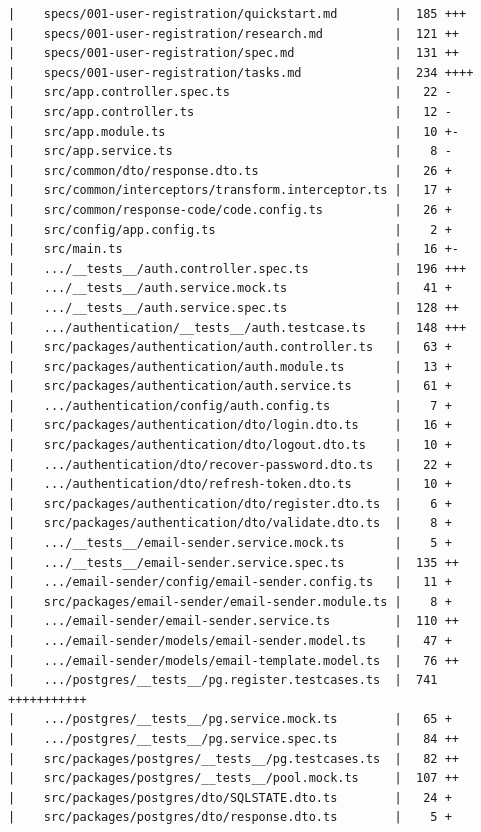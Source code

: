 \documentclass[12pt]{article}
\begin{document}
\begin{lstlisting}[numbers=none,breaklines=true]
|    specs/001-user-registration/quickstart.md        |  185 +++
|    specs/001-user-registration/research.md          |  121 ++
|    specs/001-user-registration/spec.md              |  131 ++
|    specs/001-user-registration/tasks.md             |  234 ++++
|    src/app.controller.spec.ts                       |   22 -
|    src/app.controller.ts                            |   12 -
|    src/app.module.ts                                |   10 +-
|    src/app.service.ts                               |    8 -
|    src/common/dto/response.dto.ts                   |   26 +
|    src/common/interceptors/transform.interceptor.ts |   17 +
|    src/common/response-code/code.config.ts          |   26 +
|    src/config/app.config.ts                         |    2 +
|    src/main.ts                                      |   16 +-
|    .../__tests__/auth.controller.spec.ts            |  196 +++
|    .../__tests__/auth.service.mock.ts               |   41 +
|    .../__tests__/auth.service.spec.ts               |  128 ++
|    .../authentication/__tests__/auth.testcase.ts    |  148 +++
|    src/packages/authentication/auth.controller.ts   |   63 +
|    src/packages/authentication/auth.module.ts       |   13 +
|    src/packages/authentication/auth.service.ts      |   61 +
|    .../authentication/config/auth.config.ts         |    7 +
|    src/packages/authentication/dto/login.dto.ts     |   16 +
|    src/packages/authentication/dto/logout.dto.ts    |   10 +
|    .../authentication/dto/recover-password.dto.ts   |   22 +
|    .../authentication/dto/refresh-token.dto.ts      |   10 +
|    src/packages/authentication/dto/register.dto.ts  |    6 +
|    src/packages/authentication/dto/validate.dto.ts  |    8 +
|    .../__tests__/email-sender.service.mock.ts       |    5 +
|    .../__tests__/email-sender.service.spec.ts       |  135 ++
|    .../email-sender/config/email-sender.config.ts   |   11 +
|    src/packages/email-sender/email-sender.module.ts |    8 +
|    .../email-sender/email-sender.service.ts         |  110 ++
|    .../email-sender/models/email-sender.model.ts    |   47 +
|    .../email-sender/models/email-template.model.ts  |   76 ++
|    .../postgres/__tests__/pg.register.testcases.ts  |  741 +++++++++++
|    .../postgres/__tests__/pg.service.mock.ts        |   65 +
|    .../postgres/__tests__/pg.service.spec.ts        |   84 ++
|    src/packages/postgres/__tests__/pg.testcases.ts  |   82 ++
|    src/packages/postgres/__tests__/pool.mock.ts     |  107 ++
|    src/packages/postgres/dto/SQLSTATE.dto.ts        |   24 +
|    src/packages/postgres/dto/response.dto.ts        |    5 +

\end{lstlisting}
\end{document}
